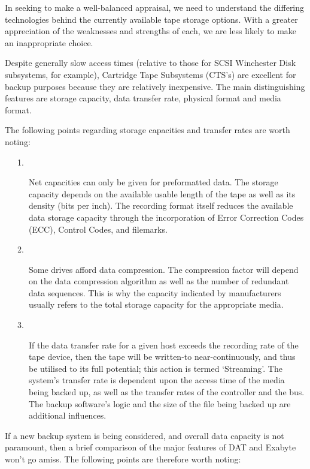 \documentclass[11pt]{article}
\begin{document}
In seeking to make a well-balanced appraisal, we need to understand the
differing technologies behind the currently available tape storage options.
With a greater appreciation of the weaknesses and strengths of each, we are
less likely to make an inappropriate choice.

Despite generally slow access times (relative to those for SCSI Winchester
Disk subsystems, for example), Cartridge Tape Subsystems (CTS's) are excellent
for backup purposes because they are relatively inexpensive. The main
distinguishing features are storage capacity, data transfer rate, physical
format and media format.

The following points regarding storage capacities and transfer rates are worth
noting:

\begin {description}

\item [\ \ \ 1.] Net capacities can only be given for preformatted data. The
storage capacity depends on the available usable length of the tape as well as
its density (bits per inch). The recording format itself reduces the available
data storage capacity through the incorporation of Error Correction Codes
(ECC), Control Codes, and filemarks.

\item [\ \ \ 2.] Some drives afford data compression. The compression factor
will depend on the data compression algorithm as well as the number of redundant
data sequences. This is why the capacity indicated by manufacturers usually
refers to the total storage capacity for the appropriate media.

\item [\ \ \ 3.] If the data transfer rate for a given host exceeds the
recording rate of the tape device, then the tape will be written-to
near-continuously, and thus be utilised to its full potential; this action is
termed `Streaming'. The system's transfer rate is dependent upon the access time
of the media being backed up, as well as the transfer rates of the controller
and the bus. The backup software's logic and the size of the file being backed
up are additional influences.

\end {description}

If a new backup system is being considered, and overall data capacity is not
paramount, then a brief comparison of the major features of DAT and Exabyte
won't go amiss. The following points are therefore worth noting:
\end{document}

